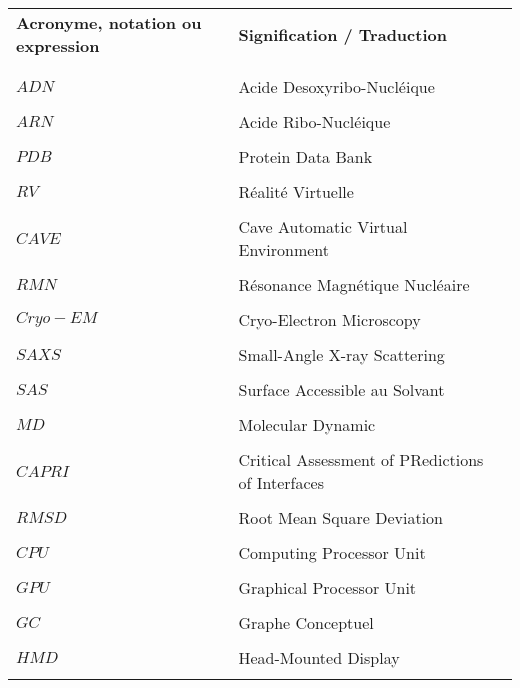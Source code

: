 


\begin{table}[htbp]
\centering
\begin{tabular}{l l l}

\textbf{Acronyme, notation ou expression} & \textbf{Signification / Traduction} & \\ \\ %
\hline
\\
$ADN$ & Acide Desoxyribo-Nucléique & \\  \\
$ARN$ & Acide Ribo-Nucléique & \\  \\
$PDB$ & Protein Data Bank & \\  \\
$RV$ & Réalité Virtuelle & \\  \\
$CAVE$ & Cave Automatic Virtual Environment & \\  \\
$RMN$ & Résonance Magnétique Nucléaire & \\  \\
$Cryo-EM$ & Cryo-Electron Microscopy & \\  \\
$SAXS$ & Small-Angle X-ray Scattering & \\  \\
$SAS$ & Surface Accessible au Solvant & \\  \\
$MD$ & Molecular Dynamic & \\  \\
$CAPRI$ & Critical Assessment of PRedictions of Interfaces & \\  \\
$RMSD$ & Root Mean Square Deviation & \\  \\
$CPU$ & Computing Processor Unit & \\  \\
$GPU$ & Graphical Processor Unit & \\  \\
$GC$ & Graphe Conceptuel & \\  \\
$HMD$ & Head-Mounted Display \\  \\

\end{tabular}
\end{table}


